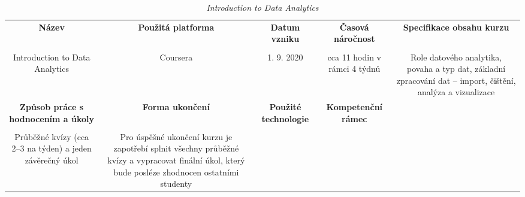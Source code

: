 \begin{landscape}

\begin{table}[htbp]

\renewcommand\thetable{6}

\caption{\textit{Introduction to Data Analytics}}\label{tab6}

\footnotesize

{

\justifying

\begin{tabularx}{\linewidth}{CCCCC}

\toprule

\textbf{Název} &

\textbf{Použitá platforma} &

\textbf{Datum vzniku} &

\textbf{Časová náročnost} &
 
\textbf{Specifikace obsahu kurzu}

\\

\tabularnewline
\midrule

Introduction to Data Analytics

&

Coursera

&

1. 9. 2020

&

cca 11 hodin v rámci 4 týdnů

&

Role datového analytika, povaha a typ dat, základní zpracování dat – import, čištění, analýza a vizualizace

\\
\toprule

\textbf{Způsob práce s hodnocením a úkoly} &

\textbf{Forma ukončení} &

\textbf{Použité technologie} &

\textbf{Kompetenční rámec} 

\\

\tabularnewline
\midrule

Průběžné kvízy (cca 2–3 na týden) a jeden závěrečný úkol    

&

Pro úspěšné ukončení kurzu je zapotřebí splnit všechny průběžné kvízy a vypracovat finální úkol, který bude posléze zhodnocen ostatními studenty


\end{tabularx}}
\end{table}
\end{landscape}

